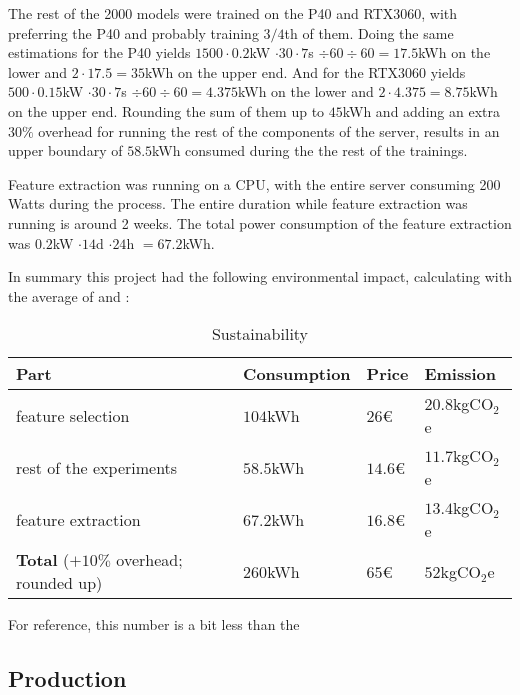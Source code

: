 The rest of the 2000 models were trained on the P40 and RTX3060, with preferring the P40 and probably training $3/4$th of them. Doing the same estimations for the P40 yields $1500 \cdot 0.2$kW $ \cdot 30 \cdot 7$s $ \div 60 \div 60 = 17.5$kWh on the lower and $2 \cdot 17.5 = 35$kWh on the upper end. And for the RTX3060 yields $500 \cdot 0.15$kW $ \cdot 30 \cdot 7$s $ \div 60 \div 60 = 4.375$kWh on the lower and $2 \cdot 4.375 = 8.75$kWh on the upper end. Rounding the sum of them up to $45$kWh and adding an extra $30\%$ overhead for running the rest of the components of the server, results in an upper boundary of $58.5$kWh consumed during the the rest of the trainings.\par
Feature extraction was running on a CPU, with the entire server consuming 200 Watts during the process. The entire duration while feature extraction was running is around 2 weeks. The total power consumption of the feature extraction was $0.2$kW $ \cdot 14$d $ \cdot 24$h $ = 67.2$kWh.\par
In summary this project had the following environmental impact, calculating with the average of  and :
\begin{table}[H]
\centering
\begin{tabular}{|l|l|l|l|}
\hline
\textbf{Part} & \textbf{Consumption} & \textbf{Price} & \textbf{Emission} \\ \hline
feature selection & $104$kWh & $26$€ & $20.8$kgCO$_{2}$e \\ \hline
rest of the experiments & $58.5$kWh & $14.6$€ & $11.7$kgCO$_{2}$e \\ \hline
feature extraction & $67.2$kWh & $16.8$€ & $13.4$kgCO$_{2}$e \\ \hline
\textbf{Total} ($+10\%$ overhead; rounded up) & $260$kWh & $65$€ & $52$kgCO$_{2}$e \\ \hline
\end{tabular}
\caption{Sustainability}
\label{tab:sus1}
\end{table}
For reference, this number is a bit less than the 

\subsection{Production}
\label{sec:susprod}

